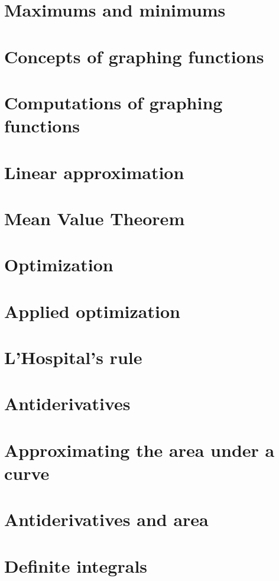 \documentclass[newpage]{xourse}
\begin{document}
\part{Maximums and minimums}

\part{Concepts of graphing functions}

\part{Computations of graphing functions}

\part{Linear approximation}

\part{Mean Value Theorem}

\part{Optimization}

\part{Applied optimization}

\part{L'Hospital's rule}

\part{Antiderivatives}

\part{Approximating the area under a curve}

\part{Antiderivatives and area}

\part{Definite integrals}
\end{document}
